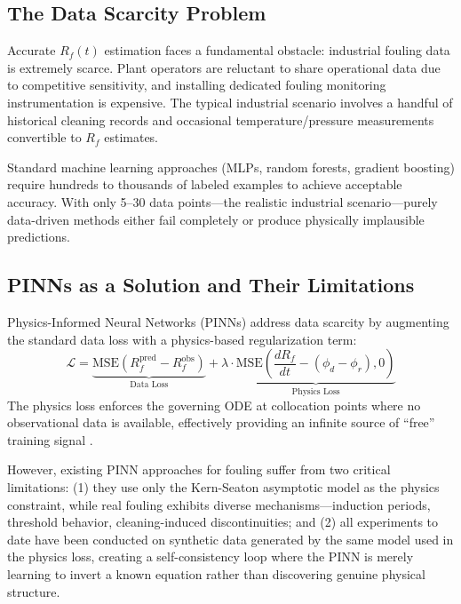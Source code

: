 \documentclass[review]{elsarticle}
\begin{document}
\subsection{The Data Scarcity Problem}

Accurate $R_f(t)$ estimation faces a fundamental obstacle: industrial fouling data is extremely scarce. Plant operators are reluctant to share operational data due to competitive sensitivity, and installing dedicated fouling monitoring instrumentation is expensive. The typical industrial scenario involves a handful of historical cleaning records and occasional temperature/pressure measurements convertible to $R_f$ estimates.

Standard machine learning approaches (MLPs, random forests, gradient boosting) require hundreds to thousands of labeled examples to achieve acceptable accuracy. With only 5--30 data points---the realistic industrial scenario---purely data-driven methods either fail completely or produce physically implausible predictions.

\subsection{PINNs as a Solution and Their Limitations}

Physics-Informed Neural Networks (PINNs) \cite{raissi2019physics} address data scarcity by augmenting the standard data loss with a physics-based regularization term:
\begin{equation}
\mathcal{L} = \underbrace{\text{MSE}(R_f^{\text{pred}} - R_f^{\text{obs}})}_{\text{Data Loss}} + \lambda \cdot \underbrace{\text{MSE}\left(\frac{dR_f}{dt} - (\phi_d - \phi_r), 0\right)}_{\text{Physics Loss}}
\end{equation}
The physics loss enforces the governing ODE at collocation points where no observational data is available, effectively providing an infinite source of ``free'' training signal \cite{karniadakis2021physics}.

However, existing PINN approaches for fouling suffer from two critical limitations: (1) they use only the Kern-Seaton asymptotic model as the physics constraint, while real fouling exhibits diverse mechanisms---induction periods, threshold behavior, cleaning-induced discontinuities; and (2) all experiments to date have been conducted on synthetic data generated by the same model used in the physics loss, creating a self-consistency loop where the PINN is merely learning to invert a known equation rather than discovering genuine physical structure.
\end{document}
